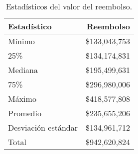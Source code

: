 \begin{table}[!htbp]
\centering
\caption{Estadísticos del valor del reembolso.} 
\label{tab:reembolso}
\begin{tabular}{lr}
  \hline
Estadístico & Reembolso \\ 
  \hline
Mínimo & \$133,043,753 \\ 
  25\% & \$134,174,831 \\ 
  Mediana & \$195,499,631 \\ 
  75\% & \$296,980,006 \\ 
  Máximo & \$418,577,808 \\ 
  Promedio & \$235,655,206 \\ 
  Desviación estándar & \$134,961,712 \\ 
  Total & \$942,620,824 \\ 
   \hline
\end{tabular}
\end{table}
